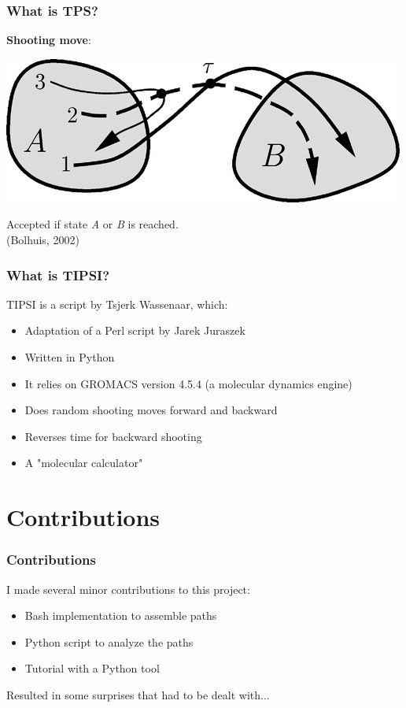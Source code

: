 \documentclass[hyperref={pdfpagelabels=false}]{beamer}
\begin{document}
\begin{frame}
\frametitle{What is TPS?}
\textbf{Shooting move}:
\begin{center}
\includegraphics[scale=0.5]{images/bolhuis2.png}
\end{center}
Accepted if state \textit{A} or \textit{B} is reached.\\
(Bolhuis, 2002)
\end{frame}

\begin{frame}
\frametitle{What is \textsc{TIPSI}?} 
\textsc{TIPSI} is a script by Tsjerk Wassenaar, which:
\begin{itemize}
\item Adaptation of a Perl script by Jarek Juraszek
\item Written in Python
\item It relies on \textsc{GROMACS} version 4.5.4 (a molecular dynamics engine)
\item Does random shooting moves forward and backward
\item Reverses time for backward shooting
\item A "molecular calculator"
\end{itemize}
\end{frame}

\section{Contributions}
\setcounter{subsection}{1}

\begin{frame}
\frametitle{Contributions}
I made several minor contributions to this project:
\begin{itemize}
\item Bash implementation to assemble paths
\item Python script to analyze the paths
\item Tutorial with a Python tool
\end{itemize}
Resulted in some surprises that had to be dealt with...
\end{frame}
\end{document}
